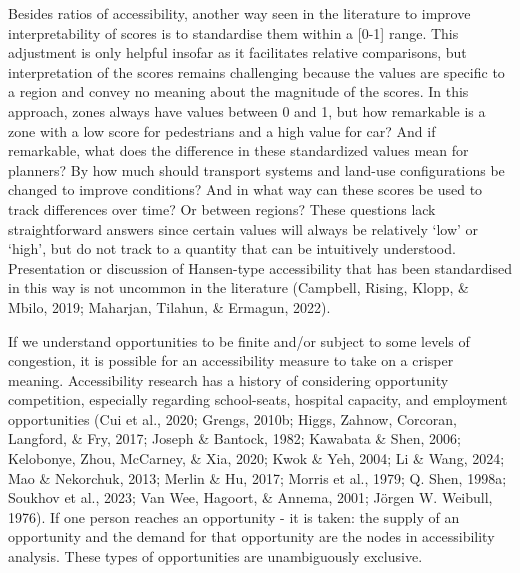 \documentclass[
11pt, %
oneside, %
english, %
singlespacing, %
]{macthesis} %
\begin{document}
Besides ratios of accessibility, another way seen in the literature to improve interpretability of scores is to standardise them within a {[}0-1{]} range. This adjustment is only helpful insofar as it facilitates relative comparisons, but interpretation of the scores remains challenging because the values are specific to a region and convey no meaning about the magnitude of the scores. In this approach, zones always have values between 0 and 1, but how remarkable is a zone with a low score for pedestrians and a high value for car? And if remarkable, what does the difference in these standardized values mean for planners? By how much should transport systems and land-use configurations be changed to improve conditions? And in what way can these scores be used to track differences over time? Or between regions? These questions lack straightforward answers since certain values will always be relatively `low' or `high', but do not track to a quantity that can be intuitively understood. Presentation or discussion of Hansen-type accessibility that has been standardised in this way is not uncommon in the literature (Campbell, Rising, Klopp, \& Mbilo, 2019; Maharjan, Tilahun, \& Ermagun, 2022).

If we understand opportunities to be finite and/or subject to some levels of congestion, it is possible for an accessibility measure to take on a crisper meaning. Accessibility research has a history of considering opportunity competition, especially regarding school-seats, hospital capacity, and employment opportunities (Cui et al., 2020; Grengs, 2010b; Higgs, Zahnow, Corcoran, Langford, \& Fry, 2017; Joseph \& Bantock, 1982; Kawabata \& Shen, 2006; Kelobonye, Zhou, McCarney, \& Xia, 2020; Kwok \& Yeh, 2004; Li \& Wang, 2024; Mao \& Nekorchuk, 2013; Merlin \& Hu, 2017; Morris et al., 1979; Q. Shen, 1998a; Soukhov et al., 2023; Van Wee, Hagoort, \& Annema, 2001; Jörgen W. Weibull, 1976). If one person reaches an opportunity - it is taken: the supply of an opportunity and the demand for that opportunity are the nodes in accessibility analysis. These types of opportunities are unambiguously exclusive.
\end{document}
